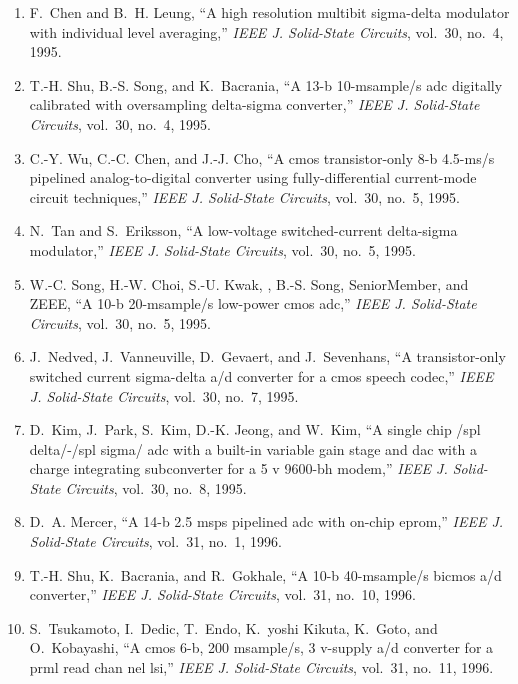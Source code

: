 \begin{enumerate}
\item
F.~Chen and B.~H. Leung, ``A high resolution multibit sigma-delta modulator
  with individual level averaging,'' \emph{{IEEE} J. Solid-State Circuits},
  vol.~30, no.~4, 1995.

\item
T.-H. Shu, B.-S. Song, and K.~Bacrania, ``A 13-b 10-msample/s adc digitally
  calibrated with oversampling delta-sigma converter,'' \emph{{IEEE} J.
  Solid-State Circuits}, vol.~30, no.~4, 1995.

\item
C.-Y. Wu, C.-C. Chen, and J.-J. Cho, ``A cmos transistor-only 8-b 4.5-ms/s
  pipelined analog-to-digital converter using fully-differential current-mode
  circuit techniques,'' \emph{{IEEE} J. Solid-State Circuits}, vol.~30, no.~5,
  1995.

\item
N.~Tan and S.~Eriksson, ``A low-voltage switched-current delta-sigma
  modulator,'' \emph{{IEEE} J. Solid-State Circuits}, vol.~30, no.~5, 1995.

\item
W.-C. Song, H.-W. Choi, S.-U. Kwak, , B.-S. Song, SeniorMember, and ZEEE, ``A
  10-b 20-msample/s low-power cmos adc,'' \emph{{IEEE} J. Solid-State
  Circuits}, vol.~30, no.~5, 1995.

\item
J.~Nedved, J.~Vanneuville, D.~Gevaert, and J.~Sevenhans, ``A transistor-only
  switched current sigma-delta a/d converter for a cmos speech codec,''
  \emph{{IEEE} J. Solid-State Circuits}, vol.~30, no.~7, 1995.

\item
D.~Kim, J.~Park, S.~Kim, D.-K. Jeong, and W.~Kim, ``A single chip /spl
  delta/-/spl sigma/ adc with a built-in variable gain stage and dac with a
  charge integrating subconverter for a 5 v 9600-bh modem,'' \emph{{IEEE} J.
  Solid-State Circuits}, vol.~30, no.~8, 1995.

\item
D.~A. Mercer, ``A 14-b 2.5 msps pipelined adc with on-chip eprom,''
  \emph{{IEEE} J. Solid-State Circuits}, vol.~31, no.~1, 1996.

\item
T.-H. Shu, K.~Bacrania, and R.~Gokhale, ``A 10-b 40-msample/s bicmos a/d
  converter,'' \emph{{IEEE} J. Solid-State Circuits}, vol.~31, no.~10, 1996.

\item
S.~Tsukamoto, I.~Dedic, T.~Endo, K.~yoshi Kikuta, K.~Goto, and O.~Kobayashi,
  ``A cmos 6-b, 200 msample/s, 3 v-supply a/d converter for a prml read chan
  nel lsi,'' \emph{{IEEE} J. Solid-State Circuits}, vol.~31, no.~11, 1996.


\end{enumerate}
